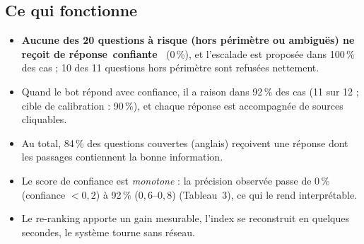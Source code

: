 \documentclass[11pt,a4paper]{article}
\providecommand{\og}{\guillemotleft\,}\providecommand{\fg}{\,\guillemotright}
\begin{document}
\subsection{Ce qui fonctionne}
\begin{itemize}[leftmargin=*,itemsep=1pt]
\item \textbf{Aucune des 20 questions \`a risque (hors p\'erim\`etre ou ambigu\"es) ne re\c coit de r\'eponse \og confiante \fg} (0\,\%), et l'escalade est propos\'ee dans 100\,\% des cas ; 10 des 11 questions hors p\'erim\`etre sont refus\'ees nettement.
\item Quand le bot r\'epond avec confiance, il a raison dans 92\,\% des cas (11 sur 12 ; cible de calibration : 90\,\%), et chaque r\'eponse est accompagn\'ee de sources cliquables.
\item Au total, 84\,\% des questions couvertes (anglais) re\c coivent une r\'eponse dont les passages contiennent la bonne information.
\item Le score de confiance est \emph{monotone} : la pr\'ecision observ\'ee passe de 0\,\% (confiance $<0{,}2$) \`a 92\,\% ($0{,}6$--$0{,}8$) (Tableau~3), ce qui le rend interpr\'etable.
\item Le re-ranking apporte un gain mesurable, l'index se reconstruit en quelques secondes, le syst\`eme tourne sans r\'eseau.
\end{itemize}
\end{document}
